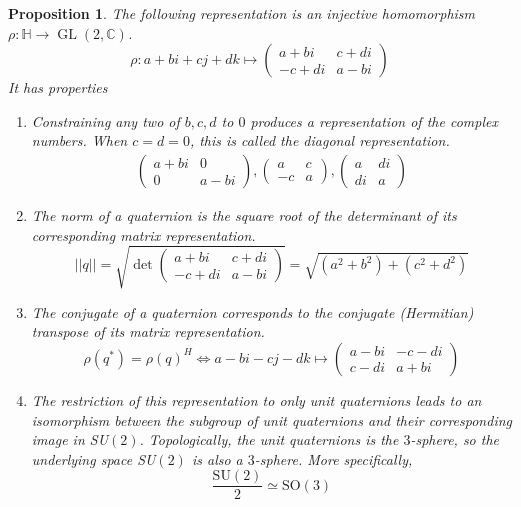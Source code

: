 \documentclass{article}
\DeclareMathOperator{\GL}{GL}
\newtheorem{proposition}[theorem]{Proposition}
\theoremstyle{remark}
\theoremstyle{definition}
\begin{document}
\begin{proposition}
The following representation is an injective homomorphism $\rho: \mathbb{H} \longrightarrow \GL(2, \mathbb{C})$. 
\[\rho: a + bi + cj + dk \mapsto \begin{pmatrix}
a+bi & c+ di \\ -c + di & a - bi
\end{pmatrix}\]
It has properties
\begin{enumerate}
    \item Constraining any two of $b, c, d$ to $0$ produces a representation of the complex numbers. When $c = d = 0$, this is called the \textit{diagonal representation}. 
    \begin{align*}
        \begin{pmatrix}
        a+bi & 0 \\ 0 & a-bi
        \end{pmatrix},  \begin{pmatrix}
        a & c \\ -c & a
        \end{pmatrix},  \begin{pmatrix}
        a & di \\ di & a
        \end{pmatrix}
    \end{align*}
    \item The norm of a quaternion is the square root of the determinant of its corresponding matrix representation. 
    \[||q|| = \sqrt{\det \begin{pmatrix}
    a+bi & c+di \\ -c+di & a-bi
    \end{pmatrix}} = \sqrt{(a^2 + b^2) + (c^2 + d^2)}\]
    \item The conjugate of a quaternion corresponds to the conjugate (Hermitian) transpose of its matrix representation. 
    \[\rho(q^*) = \rho(q)^H \iff a-bi-cj-dk \mapsto \begin{pmatrix}
    a-bi & -c-di \\ c-di & a+bi
    \end{pmatrix}\]
    \item The restriction of this representation to only unit quaternions leads to an isomorphism between the subgroup of unit quaternions and their corresponding image in SU$(2)$. Topologically, the unit quaternions is the $3$-sphere, so the underlying space SU$(2)$ is also a $3$-sphere. More specifically, 
    \[\frac{\text{SU}(2)}{2} \simeq \text{SO}(3)\]
\end{enumerate}
\end{proposition}
\end{document}
